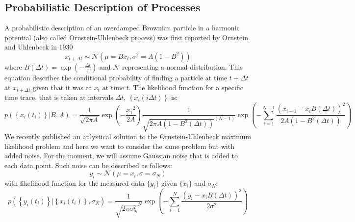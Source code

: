 \documentclass[%
 reprint,
 amsmath,amssymb,
 aps,
]{revtex4-1}
\begin{document}
\subsection{Probabilistic Description of Processes}
A probabilistic description of an overdamped Brownian particle in a harmonic potential (also called Ornstein-Uhlenbeck process) was first reported by Ornstein and Uhlenbeck in 1930 \cite{RN28}
\begin{equation}\label{OUp}
	x_{t+\Delta t} \sim \mathcal{N}(\mu=Bx_{t},\sigma^{2}=A(1-B^{2}))
\end{equation}
where $B(\Delta t) = \exp \left( { - \frac{\Delta t}{\tau}} \right)$ and $\mathcal{N}$ representing a normal distribution.
This equation describes the conditional probability of finding a particle at time $t+\Delta t$ at $x_{t+\Delta t}$ given that it was at $x_{t}$ at time $t$.  The likelihood function for a specific time trace, that is taken at intervals $\Delta t$, $\left\{x_i(i\Delta t)\right\}$ is:
\begin{equation}
	p\left( \left\{x_i(t_i)\right\} \left| B, A \right.\right) =
	\frac{1}{\sqrt {2 \pi A} }
	\exp \left( { - \frac{{x_1}^2}{2A}}\right)
	\frac{1}{{\sqrt {2\pi A(1-B^{2}(\Delta t))}^{(N-1)} }}
	\exp \left( { - \sum\limits_{i=1}^{N-1}\frac{{{{\left( {x_{i+1} - {x_i}B(\Delta t)} \right)}^2}}}{{2A(1-B^{2}(\Delta t))}}} \right)
\end{equation}
We recently published an anlystical solution to the Ornstein-Uhlenbeck maximum likelihood problem and here we want to consider the same problem but with added noise.  For the moment, we will assume Gaussian noise that is added to each data point.  Such noise can be described as follows:
\begin{equation}
	y_{i} \sim \mathcal{N}(\mu=x_{i},\sigma=\sigma_{N})
\end{equation}
with likelihood function for the measured data $\{y_{i}\}$ given $\{x_{i}\}$ and $\sigma_{N}$:
\begin{equation}
	p\left( \left\{y_i(t_i)\right\} \left| \left\{x_i(t_i)\right\},\sigma_{N} \right.\right) =
	\frac{1}{{\sqrt {2\pi \sigma_{N}^{2}}^{N} }}
	\exp \left( { - \sum\limits_{i=1}^{N}\frac{{{{\left( {y_{i} - x_{i}B(\Delta t)} \right)}^2}}}{{2\sigma^{2}}}} \right)
\end{equation}
\end{document}
